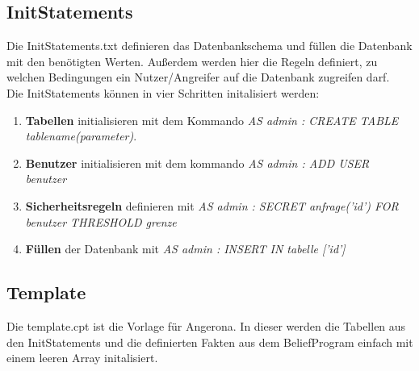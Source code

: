 \documentclass[german,version-2020-11]{uzl-thesis}
\begin{document}
\subsection{InitStatements}
Die InitStatements.txt definieren das Datenbankschema und füllen die Datenbank mit den benötigten Werten. Außerdem werden hier die Regeln definiert, zu welchen Bedingungen ein Nutzer/Angreifer auf die Datenbank zugreifen darf. \\ 
Die InitStatements können in vier Schritten initalisiert werden:
\begin{enumerate}
	\item \textbf{Tabellen }initialisieren mit dem Kommando \textit{AS admin : CREATE TABLE tablename(parameter)}.
	\item  \textbf{Benutzer  }initialisieren mit dem kommando \textit{AS admin : ADD USER benutzer}
	\item \textbf{Sicherheitsregeln} definieren mit \textit{AS admin : SECRET anfrage('id') FOR benutzer THRESHOLD grenze}
	\item \textbf{Füllen} der Datenbank mit \textit{AS admin : INSERT IN tabelle ['id']}
\end{enumerate} 

\subsection{Template}
Die template.cpt ist die Vorlage für Angerona. In dieser werden die Tabellen aus den InitStatements und die definierten Fakten aus dem BeliefProgram einfach mit einem leeren Array initalisiert.
\end{document}
